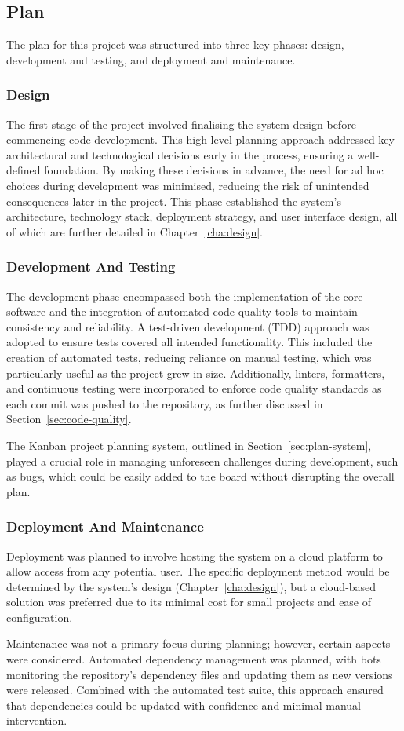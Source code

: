 \subsection{Plan}
The plan for this project was structured into three key phases: design, development and testing, and deployment and maintenance.

\subsubsection{Design}
The first stage of the project involved finalising the system design before commencing code development. This high-level planning approach addressed key architectural and technological decisions early in the process, ensuring a well-defined foundation. By making these decisions in advance, the need for ad hoc choices during development was minimised, reducing the risk of unintended consequences later in the project. This phase established the system's architecture, technology stack, deployment strategy, and user interface design, all of which are further detailed in Chapter~\ref{cha:design}.

\subsubsection{Development And Testing}
The development phase encompassed both the implementation of the core software and the integration of automated code quality tools to maintain consistency and reliability. A test-driven development (TDD) approach was adopted to ensure tests covered all intended functionality. This included the creation of automated tests, reducing reliance on manual testing, which was particularly useful as the project grew in size. Additionally, linters, formatters, and continuous testing were incorporated to enforce code quality standards as each commit was pushed to the repository, as further discussed in Section~\ref{sec:code-quality}.

The Kanban project planning system, outlined in Section~\ref{sec:plan-system}, played a crucial role in managing unforeseen challenges during development, such as bugs, which could be easily added to the board without disrupting the overall plan.

\subsubsection{Deployment And Maintenance}
Deployment was planned to involve hosting the system on a cloud platform to allow access from any potential user. The specific deployment method would be determined by the system’s design (Chapter~\ref{cha:design}), but a cloud-based solution was preferred due to its minimal cost for small projects and ease of configuration.

Maintenance was not a primary focus during planning; however, certain aspects were considered. Automated dependency management was planned, with bots monitoring the repository’s dependency files and updating them as new versions were released. Combined with the automated test suite, this approach ensured that dependencies could be updated with confidence and minimal manual intervention.
